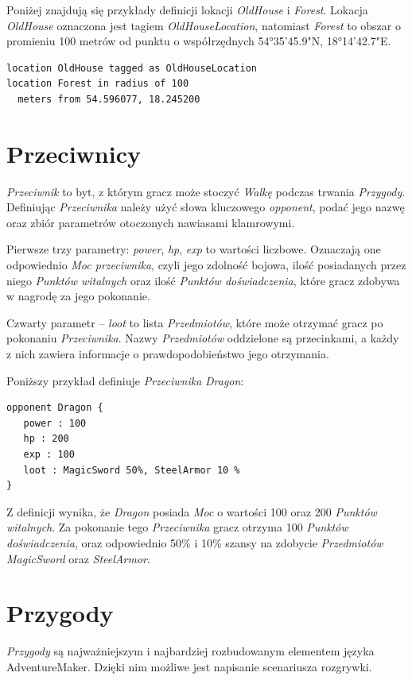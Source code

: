 \documentclass[openright]{xmgr}
\begin{document}
Poniżej znajdują się przykłady definicji lokacji \textit{OldHouse} i \textit{Forest}. Lokacja \textit{OldHouse} oznaczona jest tagiem \textit{OldHouseLocation}, natomiast \textit{Forest} to obszar o promieniu 100 metrów od punktu o współrzędnych 54°35'45.9"N, 18°14'42.7"E.
\begin{verbatim}
location OldHouse tagged as OldHouseLocation
location Forest in radius of 100 
  meters from 54.596077, 18.245200
\end{verbatim}

\section{Przeciwnicy}

\textit{Przeciwnik} to byt, z którym gracz może stoczyć \textit{Walkę} podczas trwania \textit{Przygody}. Definiując \textit{Przeciwnika} należy użyć słowa kluczowego \textit{opponent}, podać jego nazwę oraz zbiór parametrów otoczonych nawiasami klamrowymi.

Pierwsze trzy parametry: \textit{power}, \textit{hp}, \textit{exp} to wartości liczbowe. Oznaczają one odpowiednio \textit{Moc przeciwnika}, czyli jego zdolność bojowa, ilość posiadanych przez niego \textit{Punktów witalnych} oraz ilość \textit{Punktów doświadczenia}, które gracz zdobywa w nagrodę za jego pokonanie.

Czwarty parametr -- \textit{loot} to lista \textit{Przedmiotów}, które może otrzymać gracz po pokonaniu \textit{Przeciwnika}. Nazwy \textit{Przedmiotów} oddzielone są przecinkami, a każdy z nich zawiera informacje o prawdopodobieństwo jego otrzymania.

Poniższy przykład definiuje \textit{Przeciwnika} \textit{Dragon}:

\begin{verbatim}
opponent Dragon {
   power : 100
   hp : 200
   exp : 100
   loot : MagicSword 50%, SteelArmor 10 %
}
\end{verbatim}

Z definicji wynika, że \textit{Dragon} posiada \textit{Moc} o wartości 100 oraz 200 \textit{Punktów witalnych}. Za pokonanie tego \textit{Przeciwnika} gracz otrzyma 100 \textit{Punktów doświadczenia}, oraz odpowiednio 50\% i 10\% szansy na zdobycie \textit{Przedmiotów} \textit{MagicSword} oraz \textit{SteelArmor}.

\section{Przygody}
\textit{Przygody} są najważniejszym i najbardziej rozbudowanym elementem języka AdventureMaker. Dzięki nim możliwe jest napisanie scenariusza rozgrywki. 
\end{document}
